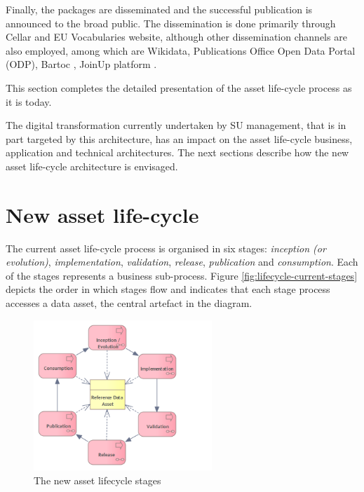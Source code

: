 	Finally, the packages are disseminated and the successful publication is announced to the broad public. The dissemination is done primarily through Cellar\citep{cdm-francesconi2015ontology} and EU Vocabularies website, although other dissemination channels are also employed, among which are Wikidata\citep{vrandevcic2014wikidata}, Publications Office Open Data Portal (ODP), Bartoc \citep{ledl2016describing}, JoinUp platform \citep{hillenius2013free}.
	
	This section completes the detailed presentation of the asset life-cycle process as it is today. 
	
	The digital transformation currently undertaken by SU management, that is in part targeted by this architecture, has an impact on the asset life-cycle business, application and technical architectures. The next sections describe how the new asset life-cycle architecture is envisaged. 
		
	\section{New asset life-cycle}
	\label{sec:lifecycle-new}	
	
    The current asset life-cycle process is organised in six stages: \textit{inception (or evolution)}, \textit{implementation}, \textit{validation}, \textit{release}, \textit{publication} and \textit{consumption}. Each of the stages represents a business sub-process. Figure \ref{fig:lifecycle-current-stages} depicts the order in which stages flow and indicates that each stage process accesses a data asset, the central artefact in the diagram.
	
	\begin{figure}[h]
		\centering
		\includegraphics[width=0.6\textwidth]{docs/architecture/images/business/Lifecycle process only (new).png}
		\caption{The new asset lifecycle stages}
		\label{fig:lifecycle-new-stages}
	\end{figure}
	

